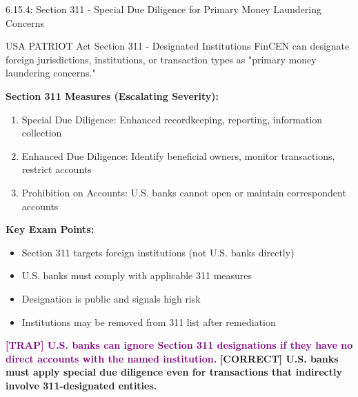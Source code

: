 \documentclass[11pt,a4paper]{beamer}
\newcommand{\trap}[1]{\textcolor{purple}{\textbf{[TRAP] #1}}}
\newcommand{\correct}[1]{\textcolor{green!50!black}{\textbf{[CORRECT] #1}}}
\begin{document}
\begin{frame}{6.15.4: Section 311 - Special Due Diligence for Primary Money Laundering Concerns}
	\begin{block}{USA PATRIOT Act Section 311 - Designated Institutions}
		FinCEN can designate foreign jurisdictions, institutions, or transaction types as "primary money laundering concerns."
	\end{block}
	\textbf{Section 311 Measures (Escalating Severity):}
	\begin{enumerate}
		\item Special Due Diligence: Enhanced recordkeeping, reporting, information collection
		\item Enhanced Due Diligence: Identify beneficial owners, monitor transactions, restrict accounts
		\item Prohibition on Accounts: U.S. banks cannot open or maintain correspondent accounts
	\end{enumerate}
	\textbf{Key Exam Points:}
	\begin{itemize}
		\item Section 311 targets foreign institutions (not U.S. banks directly)
		\item U.S. banks must comply with applicable 311 measures
		\item Designation is public and signals high risk
		\item Institutions may be removed from 311 list after remediation
	\end{itemize}
	\trap{U.S. banks can ignore Section 311 designations if they have no direct accounts with the named institution.}
	\correct{U.S. banks must apply special due diligence even for transactions that indirectly involve 311-designated entities.}
\end{frame}
\end{document}
